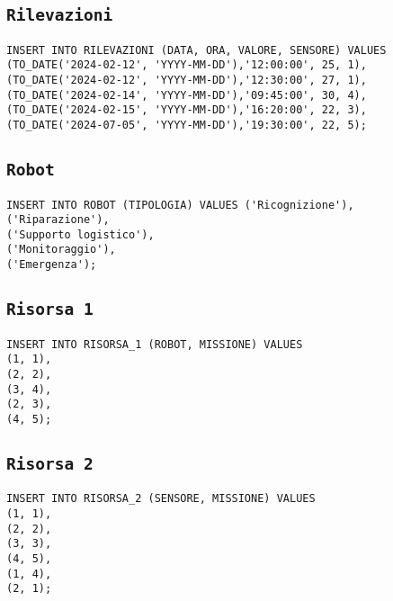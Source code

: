 \subsection{\texttt{Rilevazioni}}
\begin{verbatim}
INSERT INTO RILEVAZIONI (DATA, ORA, VALORE, SENSORE) VALUES 
(TO_DATE('2024-02-12', 'YYYY-MM-DD'),'12:00:00', 25, 1),
(TO_DATE('2024-02-12', 'YYYY-MM-DD'),'12:30:00', 27, 1),
(TO_DATE('2024-02-14', 'YYYY-MM-DD'),'09:45:00', 30, 4),
(TO_DATE('2024-02-15', 'YYYY-MM-DD'),'16:20:00', 22, 3),
(TO_DATE('2024-07-05', 'YYYY-MM-DD'),'19:30:00', 22, 5);
\end{verbatim}
\subsection{\texttt{Robot}}
\begin{verbatim}
INSERT INTO ROBOT (TIPOLOGIA) VALUES ('Ricognizione'),
('Riparazione'),
('Supporto logistico'),
('Monitoraggio'),
('Emergenza');
\end{verbatim}
\subsection{\texttt{Risorsa 1}}
\begin{verbatim}
INSERT INTO RISORSA_1 (ROBOT, MISSIONE) VALUES 
(1, 1),
(2, 2),
(3, 4),
(2, 3),
(4, 5);
\end{verbatim}
\subsection{\texttt{Risorsa 2}}
\begin{verbatim}
INSERT INTO RISORSA_2 (SENSORE, MISSIONE) VALUES 
(1, 1),
(2, 2),
(3, 3),
(4, 5),
(1, 4),
(2, 1);
\end{verbatim}


